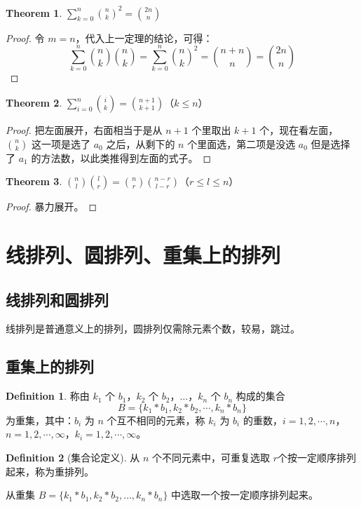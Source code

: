 \documentclass[oneside]{book}
\theoremstyle{definition}
\newtheorem{definition}{Definition}[section]
\newtheorem{theorem}{Theorem}[section]
\begin{document}
\begin{theorem}
	\( \sum_{k=0}^{n}\binom{n}{k}^2 = \binom{2n}{n} \)
\end{theorem}

\begin{proof}
	令 \( m = n \)，代入上一定理的结论，可得：
	\[
	\sum_{k=0}^{n}\binom{n}{k}\binom{n}{k} = \sum_{k=0}^{n}\binom{n}{k}^2 = \binom{n+n}{n} = \binom{2n}{n}
	\]
\end{proof}

\begin{theorem}
	\( \sum_{i=0}^{n}\binom{i}{k} = \binom{n+1}{k+1} \)（\( k \leq n \)）
\end{theorem}

\begin{proof}
	把左面展开，右面相当于是从 \(n+1\) 个里取出 \(k+1 \) 个，现在看左面，\(\binom{n}{k}\) 这一项是选了 \(a_0\) 之后，从剩下的 \(n\) 个里面选，第二项是没选 \(a_0\) 但是选择了 \(a_1\) 的方法数，以此类推得到左面的式子。
\end{proof}

\begin{theorem}
	\( \binom{n}{l}\binom{l}{r} = \binom{n}{r}\binom{n-r}{l-r} \)（\( r \leq l \leq n \)）
\end{theorem}

\begin{proof}
	暴力展开。
\end{proof}


\section{线排列、圆排列、重集上的排列}
\subsection{线排列和圆排列}
线排列是普通意义上的排列，圆排列仅需除元素个数，较易，跳过。
\subsection{重集上的排列}
\begin{definition}
	称由 \( k_1 \) 个 \( b_1 \)，\( k_2 \) 个 \( b_2 \)，\(\dots\)，\( k_n \) 个 \( b_n \) 构成的集合  
	\[B = \{k_1 * b_1, k_2 * b_2, \cdots, k_n * b_n\}\]为重集，其中：\( b_i \) 为 \( n \) 个互不相同的元素，称 \( k_i \) 为 \( b_i \) 的重数，\( i = 1, 2, \cdots, n \)，\( n = 1, 2, \cdots, \infty \)，\( k_i = 1, 2, \cdots, \infty \)。
\end{definition}
\begin{definition}[集合论定义]
	从 \( n \) 个不同元素中，可重复选取 \(r\)个按一定顺序排列起来，称为重排列。
	
	从重集 \( B=\{k_1 * b_1, k_2 * b_2, \ldots, k_n * b_n\} \) 中选取一个按一定顺序排列起来。
\end{definition}
\end{document}
